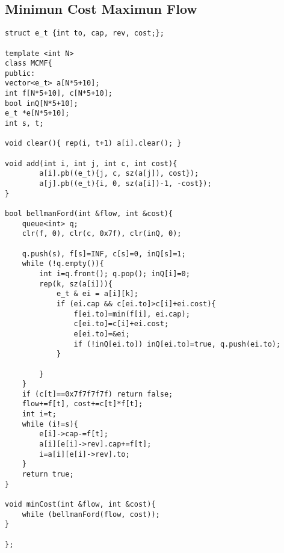 \subsection{Minimun Cost Maximun Flow}
\begin{lstlisting}
struct e_t {int to, cap, rev, cost;}; 

template <int N>
class MCMF{           
public:          
vector<e_t> a[N*5+10]; 
int f[N*5+10], c[N*5+10];
bool inQ[N*5+10];
e_t *e[N*5+10];
int s, t;

void clear(){ rep(i, t+1) a[i].clear(); }

void add(int i, int j, int c, int cost){ 
        a[i].pb((e_t){j, c, sz(a[j]), cost}); 
        a[j].pb((e_t){i, 0, sz(a[i])-1, -cost}); 
} 

bool bellmanFord(int &flow, int &cost){
    queue<int> q; 
    clr(f, 0), clr(c, 0x7f), clr(inQ, 0);
    
    q.push(s), f[s]=INF, c[s]=0, inQ[s]=1;
    while (!q.empty()){
        int i=q.front(); q.pop(); inQ[i]=0;
        rep(k, sz(a[i])){
            e_t & ei = a[i][k];
            if (ei.cap && c[ei.to]>c[i]+ei.cost){
                f[ei.to]=min(f[i], ei.cap);
                c[ei.to]=c[i]+ei.cost;
                e[ei.to]=&ei;                
                if (!inQ[ei.to]) inQ[ei.to]=true, q.push(ei.to);
            }
            
        }
    }
    if (c[t]==0x7f7f7f7f) return false;
    flow+=f[t], cost+=c[t]*f[t];
    int i=t;
    while (i!=s){
        e[i]->cap-=f[t];
        a[i][e[i]->rev].cap+=f[t];
        i=a[i][e[i]->rev].to;
    }
    return true;
}

void minCost(int &flow, int &cost){
    while (bellmanFord(flow, cost));    
}

};
\end{lstlisting}
